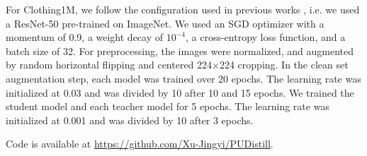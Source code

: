 \documentclass[conference]{IEEEtran}
\begin{document}
For Clothing1M, we follow the configuration used in previous works \cite{arazo2019unsupervised,li2019learning,tanaka2018joint, xu2019l_dmi, zhang2019metacleaner, lee2018cleannet, han2019deep}, i.e. we used a ResNet-50 \cite{he2016identity} pre-trained on ImageNet. We used an SGD optimizer with a momentum of 0.9, a weight decay of $10^{-4}$, a cross-entropy loss function, and a batch size of 32.
For preprocessing, the images were normalized, and augmented by random horizontal flipping and centered 224$\times$224 cropping. 
In the clean set augmentation step, each model was trained over 20 epochs. The learning rate was initialized at 0.03 and was divided by 10 after 10 and 15 epochs. We trained the student model and each teacher model for 5 epochs. The learning rate was initialized at 0.001 and was divided by 10 after 3 epochs.

Code is available at \url{https://github.com/Xu-Jingyi/PUDistill}.
\end{document}
